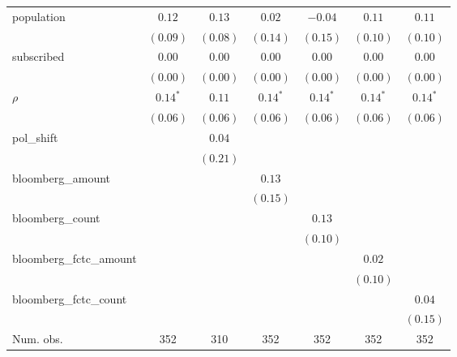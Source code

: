 \begin{table}[!h]
\begin{center}
\begin{tabular}{l c c c c c c }
population              & $0.12$       & $0.13$       & $0.02$       & $-0.04$      & $0.11$       & $0.11$       \\
                        & $(0.09)$     & $(0.08)$     & $(0.14)$     & $(0.15)$     & $(0.10)$     & $(0.10)$     \\
subscribed              & $0.00$       & $0.00$       & $0.00$       & $0.00$       & $0.00$       & $0.00$       \\
                        & $(0.00)$     & $(0.00)$     & $(0.00)$     & $(0.00)$     & $(0.00)$     & $(0.00)$     \\
$\rho$                  & $0.14^{*}$   & $0.11$       & $0.14^{*}$   & $0.14^{*}$   & $0.14^{*}$   & $0.14^{*}$   \\
                        & $(0.06)$     & $(0.06)$     & $(0.06)$     & $(0.06)$     & $(0.06)$     & $(0.06)$     \\
pol\_shift              &              & $0.04$       &              &              &              &              \\
                        &              & $(0.21)$     &              &              &              &              \\
bloomberg\_amount       &              &              & $0.13$       &              &              &              \\
                        &              &              & $(0.15)$     &              &              &              \\
bloomberg\_count        &              &              &              & $0.13$       &              &              \\
                        &              &              &              & $(0.10)$     &              &              \\
bloomberg\_fctc\_amount &              &              &              &              & $0.02$       &              \\
                        &              &              &              &              & $(0.10)$     &              \\
bloomberg\_fctc\_count  &              &              &              &              &              & $0.04$       \\
                        &              &              &              &              &              & $(0.15)$     \\
\midrule
Num. obs.               & 352          & 310          & 352          & 352          & 352          & 352          \\

\end{tabular}
\end{center}
\end{table}
